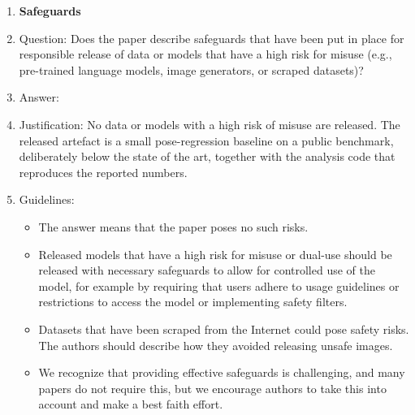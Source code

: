 \begin{enumerate}
\item {\bf Safeguards}
    \item[] Question: Does the paper describe safeguards that have been put in place for responsible release of data or models that have a high risk for misuse (e.g., pre-trained language models, image generators, or scraped datasets)?
    \item[] Answer: \answerNA{}
    \item[] Justification: No data or models with a high risk of misuse are released. The released artefact is a
    small pose-regression baseline on a public benchmark, deliberately below the state of the
    art, together with the analysis code that reproduces the reported numbers.
    \item[] Guidelines:
    \begin{itemize}
        \item The answer \answerNA{} means that the paper poses no such risks.
        \item Released models that have a high risk for misuse or dual-use should be released with necessary safeguards to allow for controlled use of the model, for example by requiring that users adhere to usage guidelines or restrictions to access the model or implementing safety filters. 
        \item Datasets that have been scraped from the Internet could pose safety risks. The authors should describe how they avoided releasing unsafe images.
        \item We recognize that providing effective safeguards is challenging, and many papers do not require this, but we encourage authors to take this into account and make a best faith effort.
    \end{itemize}


\end{enumerate}
